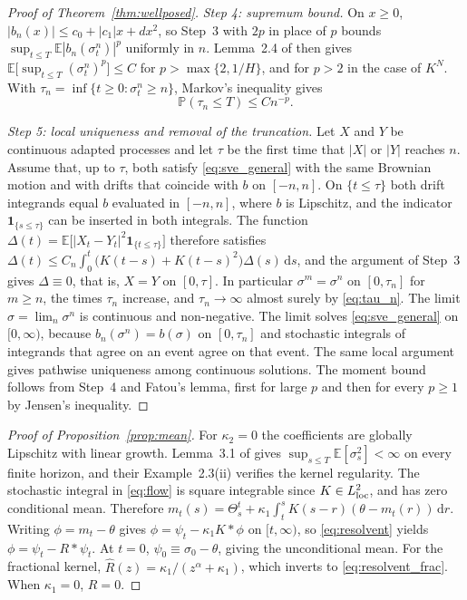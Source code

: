 \documentclass{rQUF2e}
\theoremstyle{plain}
\theoremstyle{definition}
\theoremstyle{remark}
\newcommand{\D}{\mathrm{d}}
\newcommand{\E}{\mathbb{E}}
\renewcommand{\P}{\mathbb{P}}
\newcommand{\one}{\mathbf{1}}
\begin{document}
\begin{proof}[Proof of Theorem~\ref{thm:wellposed}]
\emph{Step 4: supremum bound.} On $x\ge0$, $|b_n(x)|\le c_0+|c_1|x+dx^2$, so Step~3 with $2p$ in place of $p$ bounds $\sup_{t\le T}\E|b_n(\sigma^n_t)|^p$ uniformly in $n$. Lemma~2.4 of \citet{AbiJaberLarssonPulido2019} then gives $\E\big[\sup_{t\le T}(\sigma^n_t)^p\big]\le C$ for $p>\max\{2,1/H\}$, and for $p>2$ in the case of $K^N$. With $\tau_n=\inf\{t\ge0:\sigma^n_t\ge n\}$, Markov's inequality gives
\begin{equation}\label{eq:tau_n}
\P(\tau_n\le T)\le Cn^{-p} .
\end{equation}

\emph{Step 5: local uniqueness and removal of the truncation.} Let $X$ and $Y$ be continuous adapted processes and let $\tau$ be the first time that $|X|$ or $|Y|$ reaches $n$. Assume that, up to $\tau$, both satisfy \eqref{eq:sve_general} with the same Brownian motion and with drifts that coincide with $b$ on $[-n,n]$. On $\{t\le\tau\}$ both drift integrands equal $b$ evaluated in $[-n,n]$, where $b$ is Lipschitz, and the indicator $\one_{\{s\le\tau\}}$ can be inserted in both integrals. The function $\Delta(t)=\E\big[|X_t-Y_t|^2\one_{\{t\le\tau\}}\big]$ therefore satisfies $\Delta(t)\le C_n\int_0^t\big(K(t-s)+K(t-s)^2\big)\Delta(s)\,\D s$, and the argument of Step~3 gives $\Delta\equiv0$, that is, $X=Y$ on $[0,\tau]$. In particular $\sigma^m=\sigma^n$ on $[0,\tau_n]$ for $m\ge n$, the times $\tau_n$ increase, and $\tau_n\to\infty$ almost surely by \eqref{eq:tau_n}. The limit $\sigma=\lim_n\sigma^n$ is continuous and non-negative. The limit solves \eqref{eq:sve_general} on $[0,\infty)$, because $b_n(\sigma^n)=b(\sigma)$ on $[0,\tau_n]$ and stochastic integrals of integrands that agree on an event agree on that event. The same local argument gives pathwise uniqueness among continuous solutions. The moment bound follows from Step~4 and Fatou's lemma, first for large $p$ and then for every $p\ge1$ by Jensen's inequality. \end{proof}

\begin{proof}[Proof of Proposition~\ref{prop:mean}] For $\kappa_2=0$ the coefficients are globally Lipschitz with linear growth. Lemma~3.1 of \citet{AbiJaberLarssonPulido2019} gives $\sup_{s\le T}\E[\sigma_s^2]<\infty$ on every finite horizon, and their Example~2.3(ii) verifies the kernel regularity. The stochastic integral in \eqref{eq:flow} is square integrable since $K\in L^2_{\rm loc}$, and has zero conditional mean. Therefore $m_t(s)=\Theta^t_s+\kappa_1\int_t^sK(s-r)(\theta-m_t(r))\,\D r$. Writing $\phi=m_t-\theta$ gives $\phi=\psi_t-\kappa_1K*\phi$ on $[t,\infty)$, so \eqref{eq:resolvent} yields $\phi=\psi_t-R*\psi_t$. At $t=0$, $\psi_0\equiv\sigma_0-\theta$, giving the unconditional mean. For the fractional kernel, $\widehat R(z)=\kappa_1/(z^\alpha+\kappa_1)$, which inverts to \eqref{eq:resolvent_frac}. When $\kappa_1=0$, $R=0$. \end{proof}
\end{document}
